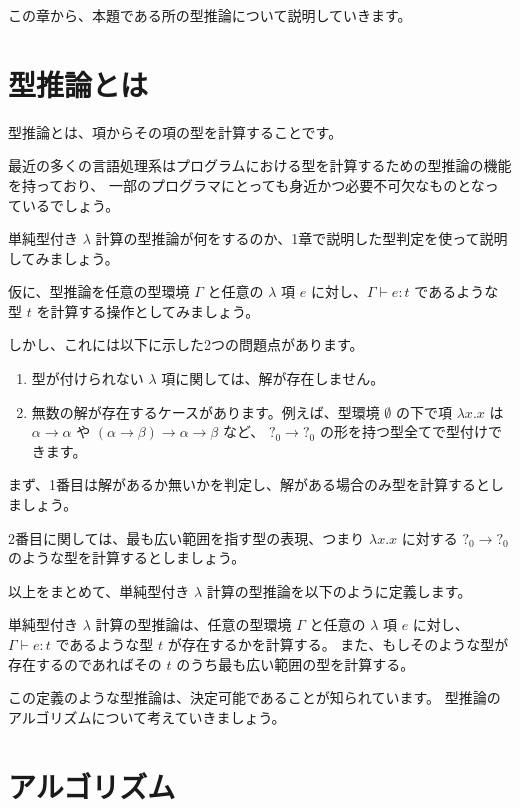 
この章から、本題である所の型推論について説明していきます。

\section{型推論とは}

型推論とは、項からその項の型を計算することです。

最近の多くの言語処理系はプログラムにおける型を計算するための型推論の機能を持っており、
一部のプログラマにとっても身近かつ必要不可欠なものとなっているでしょう。

単純型付き $\lambda$ 計算の型推論が何をするのか、1章で説明した型判定を使って説明してみましょう。

仮に、型推論を任意の型環境 $\Gamma$ と任意の $\lambda$ 項 $e$ に対し、$\Gamma \vdash e : t$
であるような型 $t$ を計算する操作としてみましょう。

しかし、これには以下に示した2つの問題点があります。

\begin{enumerate}
  \item 型が付けられない $\lambda$ 項に関しては、解が存在しません。
  \item 無数の解が存在するケースがあります。例えば、型環境 $\emptyset$ の下で項 $\lambda x . x$ は
        $\alpha \to \alpha$ や $(\alpha \to \beta) \to \alpha \to \beta$ など、
        $?_0 \to ?_0$ の形を持つ型全てで型付けできます。
\end{enumerate}

まず、1番目は解があるか無いかを判定し、解がある場合のみ型を計算するとしましょう。

2番目に関しては、最も広い範囲を指す型の表現、つまり $\lambda x . x$ に対する $?_0 \to ?_0$
のような型を計算するとしましょう。

以上をまとめて、単純型付き $\lambda$ 計算の型推論を以下のように定義します。

\begin{definition}
単純型付き $\lambda$ 計算の型推論は、任意の型環境 $\Gamma$ と任意の $\lambda$ 項 $e$ に対し、
$\Gamma \vdash e : t$ であるような型 $t$ が存在するかを計算する。
また、もしそのような型が存在するのであればその $t$ のうち最も広い範囲の型を計算する。
\end{definition}

この定義のような型推論は、決定可能であることが知られています。
型推論のアルゴリズムについて考えていきましょう。

\section{アルゴリズム}

